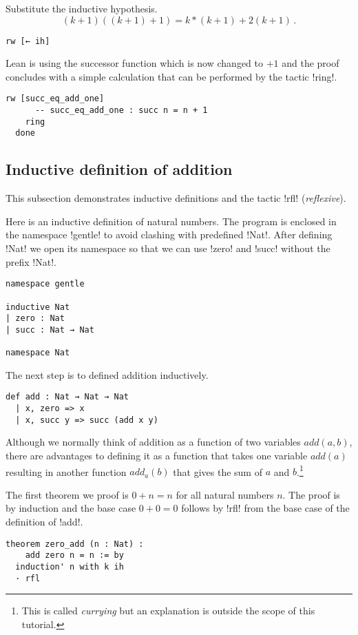 Substitute the inductive hypothesis.
\[
(k+1)((k+1)+1)=k * (k+1) + 2(k+1)\,.
\]
\begin{Verbatim}[firstnumber=last]
    rw [← ih]
\end{Verbatim}
Lean is using the successor function which is now changed to $+1$ and the proof concludes with a simple calculation that can be performed by the tactic !ring!.
\begin{Verbatim}[firstnumber=last]
    rw [succ_eq_add_one]
      -- succ_eq_add_one : succ n = n + 1
    ring
  done
\end{Verbatim}

\subsection{Inductive definition of addition}

This subsection demonstrates inductive definitions and the tactic !rfl! (\emph{reflexive}).

Here is an inductive definition of natural numbers. The program is enclosed in the namespace !gentle! to avoid clashing with predefined !Nat!. After defining !Nat! we open its namespace so that we can use !zero! and !succ! without the prefix !Nat!.
\begin{Verbatim}
namespace gentle

inductive Nat
| zero : Nat
| succ : Nat → Nat

namespace Nat
\end{Verbatim}

The next step is to defined addition inductively.
\begin{Verbatim}[firstnumber=last]
def add : Nat → Nat → Nat
  | x, zero => x
  | x, succ y => succ (add x y)
\end{Verbatim}
Although we normally think of addition as a function of two variables $\textit{add}(a,b)$, there are advantages to defining it as a function that takes one variable $\textit{add}(a)$ resulting in another function $\textit{add}_{a}(b)$ that gives the sum of $a$ and $b$.\footnote{This is called \emph{currying} but an explanation is outside the scope of this tutorial.}

The first theorem we proof is $0+n=n$ for all natural numbers $n$. The proof is by induction and the base case $0+0=0$ follows by !rfl! from the base case of the definition of !add!.
\begin{Verbatim}[firstnumber=last]
theorem zero_add (n : Nat) :
    add zero n = n := by
  induction' n with k ih
  · rfl
\end{Verbatim}

